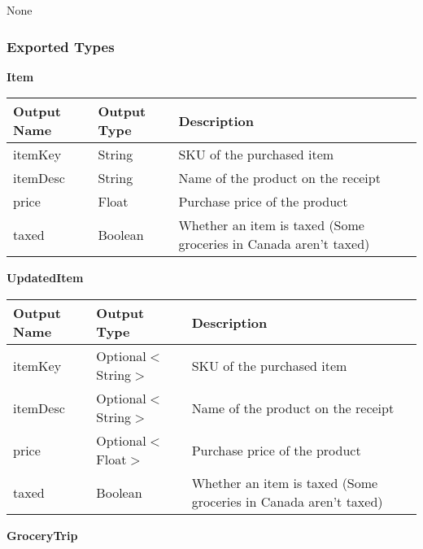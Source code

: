 \documentclass[12pt, titlepage]{article}
\begin{document}
None

\subsubsection{Exported Types}

\textbf{Item}

\begin{table}[H]
  \begin{tabular}{|p{}|p{}|p{}|}
    \hline
    \textbf{Output Name} & \textbf{Output Type} & \textbf{Description} \\
    \hline
    itemKey & String & SKU of the purchased item \\
    \hline
    itemDesc & String & Name of the product on the receipt \\
    \hline
    price & Float & Purchase price of the product \\
    \hline
    taxed & Boolean & Whether an item is taxed (Some groceries in Canada aren't taxed) \\
    \hline
  \end{tabular}
\end{table}

\textbf{UpdatedItem}

\begin{table}[H]
  \begin{tabular}{|p{}|p{}|p{}|}
    \hline
    \textbf{Output Name} & \textbf{Output Type} & \textbf{Description} \\
    \hline
    itemKey & Optional$<$String$>$ & SKU of the purchased item \\
    \hline
    itemDesc & Optional$<$String$>$ & Name of the product on the receipt \\
    \hline
    price & Optional$<$Float$>$ & Purchase price of the product \\
    \hline
    taxed & Boolean & Whether an item is taxed (Some groceries in Canada aren't taxed) \\
    \hline
  \end{tabular}
\end{table}

\textbf{GroceryTrip}
\end{document}
